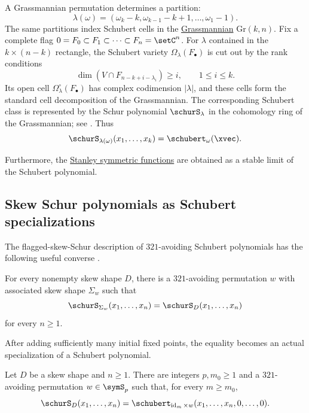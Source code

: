 A Grassmannian permutation determines a partition:
\[
\lambda(\omega) = (\omega_k - k, \omega_{k-1} - k + 1, \dotsc, \omega_1 - 1 ).
\]
The same partitions index Schubert cells in the \hyperref[grassmannian]{Grassmannian}
$\mathrm{Gr}(k,n)$.  Fix a complete flag
$0=F_0\subset F_1\subset \dotsb \subset F_n=\setC^n$.
For $\lambda$ contained in the $k\times(n-k)$ rectangle, the Schubert variety
$\Omega_\lambda(F_\bullet)$ is cut out by the rank conditions
\[
  \dim(V\cap F_{n-k+i-\lambda_i}) \geq i,\qquad 1\leq i\leq k.
\]
Its open cell $\Omega^\circ_\lambda(F_\bullet)$ has complex codimension
$|\lambda|$, and these cells form the standard cell decomposition of the
Grassmannian.  The corresponding Schubert class is represented by the Schur
polynomial $\schurS_\lambda$ in the cohomology ring of the Grassmannian; see
\cite[Ch.~9]{Fulton1997}.
Thus
\begin{equation*}
\schurS_{\lambda(\omega)}(x_1,\dotsc,x_k) = \schubert_{\omega}(\xvec).
\end{equation*}

Furthermore, the \hyperref[stanleySym]{Stanley symmetric functions}
are obtained as a stable limit of the Schubert polynomial.


\subsection[skewSchurAsSchubert]{Skew Schur polynomials as Schubert specializations}

The flagged-skew-Schur description of \(321\)-avoiding Schubert polynomials
has the following useful converse
\cite{BilleyJockuschStanley1993,Zhang2026x}.

\begin{lemma}
For every nonempty skew shape \(D\), there is a \(321\)-avoiding permutation
\(w\) with associated skew shape \(\Sigma_w\) such that
\[
  \schurS_{\Sigma_w}(x_1,\dotsc,x_n)
  =
  \schurS_D(x_1,\dotsc,x_n)
\]
for every \(n\geq1\).
\end{lemma}

After adding sufficiently many initial fixed points, the equality becomes an
actual specialization of a Schubert polynomial.

\begin{proposition}
\label{skewSchurFiniteSchubertSpecialization}
Let \(D\) be a skew shape and \(n\geq1\).  There are integers \(p,m_0\geq1\)
and a \(321\)-avoiding permutation \(w\in\symS_p\) such that, for every
\(m\geq m_0\),
\[
  \schurS_D(x_1,\dotsc,x_n)
  =
  \schubert_{\operatorname{id}_m\times w}
  (x_1,\dotsc,x_n,0,\dotsc,0).
\]
\end{proposition}

